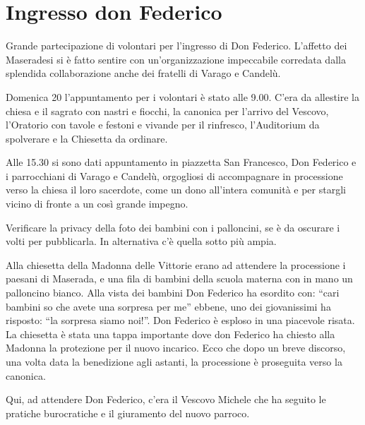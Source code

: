 \section{Ingresso don Federico}


Grande partecipazione di volontari per l’ingresso di Don Federico. L’affetto dei Maseradesi si è fatto sentire con un’organizzazione impeccabile corredata dalla splendida collaborazione anche dei fratelli di Varago e Candelù.


Domenica 20 l’appuntamento per i volontari è stato alle 9.00. C’era da allestire la chiesa e il sagrato con nastri e fiocchi, la canonica per l’arrivo del Vescovo, l’Oratorio con tavole e festoni e vivande per il rinfresco, l’Auditorium da spolverare e la Chiesetta da ordinare.


Alle 15.30 si sono dati appuntamento in piazzetta San Francesco, Don Federico e i parrocchiani di Varago e Candelù, orgogliosi di accompagnare in processione verso la chiesa il loro sacerdote, come un dono all’intera comunità e per stargli vicino di fronte a un così grande impegno.


Verificare la privacy della foto dei bambini con i  palloncini, se è da oscurare i volti per pubblicarla.
In alternativa c’è quella sotto più ampia.


Alla chiesetta della Madonna delle Vittorie erano ad attendere la processione i paesani di Maserada, e una fila di bambini della scuola materna con in mano un palloncino bianco. Alla vista dei bambini Don Federico ha esordito con: “cari bambini so che avete una sorpresa per me” ebbene, uno dei giovanissimi ha risposto: “la sorpresa siamo noi!”. Don Federico è esploso in una piacevole risata. La chiesetta è stata una tappa importante dove don Federico ha chiesto alla Madonna la protezione per il nuovo incarico. Ecco che dopo un breve discorso, una volta data la benedizione agli astanti, la processione è proseguita verso la canonica.

Qui, ad attendere Don Federico, c’era il Vescovo Michele che ha seguito le pratiche burocratiche e il giuramento del nuovo parroco.

